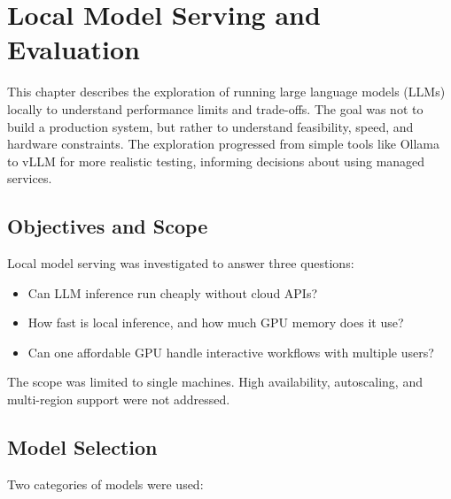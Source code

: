 \chapter{Local Model Serving and Evaluation}
\label{ch:LocalModelServing}

This chapter describes the exploration of running large language models (LLMs)
locally to understand performance limits and trade-offs. The goal was not to build
a production system, but rather to understand feasibility, speed, and hardware
constraints. The exploration progressed from simple tools like Ollama to vLLM for
more realistic testing, informing decisions about using managed services.

\section{Objectives and Scope}
\label{sec:LocalServing_Objectives}

Local model serving was investigated to answer three questions:

\begin{itemize}
      \item Can LLM inference run cheaply without cloud APIs?
      \item How fast is local inference, and how much GPU memory does it use?
      \item Can one affordable GPU handle interactive workflows with multiple users?
\end{itemize}

The scope was limited to single machines. High availability, autoscaling, and
multi-region support were not addressed.

\section{Model Selection}
\label{sec:LocalServing_ModelSelection}

Two categories of models were used:

